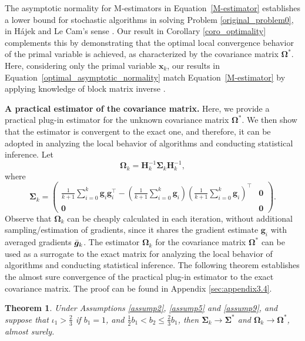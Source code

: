 \documentclass[aos]{imsart}
\numberwithin{equation}{section}
\theoremstyle{plain}
\newtheorem{theorem}{Theorem}
\begin{document}
The asymptotic normality for M-estimators in Equation~\eqref{M-estimator} establishes a lower bound for stochastic algorithms in solving Problem \eqref{original_problem0}, in H\'ajek and Le Cam's sense \cite{le2000asymptotics, van2000asymptotic}. 
Our result in Corollary \ref{coro_optimality} complements this by demonstrating that the optimal local convergence behavior of the primal variable is achieved, as characterized by the covariance matrix $\bm{\Omega}^{*}$. Here, considering only the primal variable $\bm{x}_k$, our results in Equation~\eqref{optimal_asymptotic_normality} match Equation~\eqref{M-estimator} by applying knowledge of block matrix inverse \cite[Corollary~2.3]{tian2009inverse}.

\textbf{A practical estimator of the covariance matrix.}
Here, we provide a practical plug-in estimator for the unknown covariance matrix $\bm{\Omega}^{*}$. 
We then show that the estimator is convergent to the exact one, and therefore, it can be adopted in analyzing the local behavior of algorithms and conducting statistical inference.
Let 
\begin{equation}
    \bm{\Omega}_{k} = \bm{H}_{k}^{-1} \bm{\Sigma}_{k} \bm{H}_{k}^{-1},
\end{equation}
where 
\begin{equation*}
    \bm{\Sigma}_{k} = \left( \begin{array}{cc}
        \frac{1}{k+1}\sum_{i=0}^{k} \bm{g}_i \bm{g}_i^{\top} - \left( \frac{1}{k+1}\sum_{i=0}^{k} \bm{g}_i\right)\left( \frac{1}{k+1}\sum_{i=0}^{k} \bm{g}_i\right)^{\top} &  \bm{0}\\
         \bm{0} & \bm{0}
    \end{array}\right).
\end{equation*}
Observe that $\bm{\Omega}_k$ can be cheaply calculated in each iteration, without additional sampling/estimation of gradients, since it shares the gradient estimate $\bm{g}_i$ with averaged gradients $\Bar{\bm{g}}_k$.
The estimator $\bm{\Omega}_k$ for the covariance matrix $\bm{\Omega}^{*}$ can be used as a surrogate to the exact matrix for analyzing the local behavior of algorithms and conducting statistical inference.
The following theorem establishes the almost sure convergence of the practical plug-in estimator to the exact covariance matrix. The proof can be found in Appendix \ref{sec:appendix3.4}.


\begin{theorem}
\label{theorem_pratical_normality}
    Under Assumptions \ref{assump2}, \ref{assump5} and  \ref{assump9}, and suppose that $\iota_1>\frac{2}{3}$ if $b_1=1$, and $\frac{1}{2} b_1 < b_2 \leq \frac{2}{3}b_1$, then $\bm{\Sigma}_{k} \to \bm{\Sigma}^{*}$ and $ \bm{\Omega}_{k} \to \bm{\Omega}^{*}$, almost surely.
\end{theorem}
\end{document}
